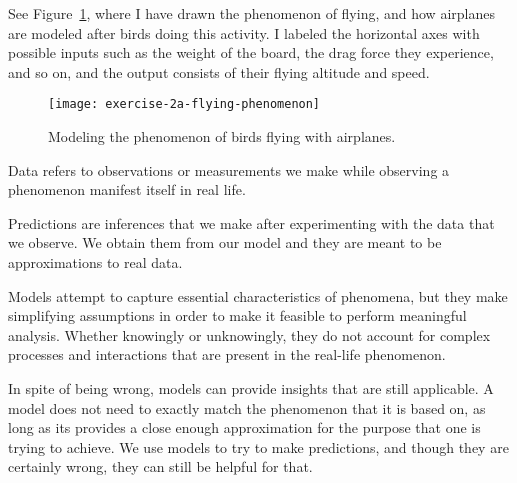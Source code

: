 \documentclass[12pt]{article}
\begin{document}
\begin{enumerate}


See Figure~\ref{fig:2a-flying}, where I have drawn the phenomenon of flying, and how airplanes
are modeled after birds doing this activity. I labeled the horizontal axes with possible
inputs such as the weight of the board, the drag force they experience, and so on,
and the output consists of their flying altitude and speed.

\begin{figure}
	\centering
	\texttt{[image: exercise-2a-flying-phenomenon]}
	\caption{Modeling the phenomenon of birds flying with airplanes.}
	\label{fig:2a-flying}
\end{figure}


Data refers to observations or measurements we make while observing a phenomenon manifest itself in real life.



Predictions are inferences that we make after experimenting with the data that we observe.
We obtain them from our model and they are meant to be approximations to real data.


Models attempt to capture essential characteristics of phenomena, but they make simplifying
assumptions in order to make it feasible to perform meaningful analysis. Whether knowingly or
unknowingly, they do not account for complex processes and interactions that are present
in the real-life phenomenon.


In spite of being wrong, models can provide insights that are still applicable. A model
does not need to exactly match the phenomenon that it is based on, as long as its provides
a close enough approximation for the purpose that one is trying to achieve. We use
models to try to make predictions, and though they are certainly wrong, they can still
be helpful for that.


\end{enumerate}
\end{document}
